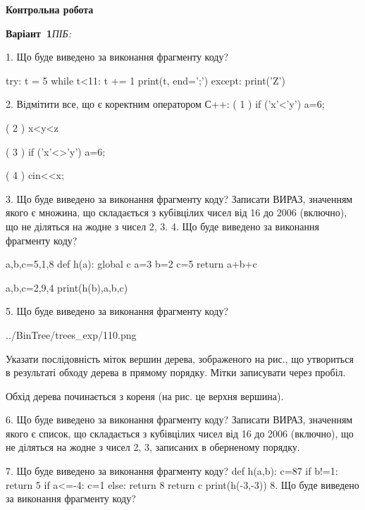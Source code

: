 \documentclass[11pt]{article}
\begin{document}
{\large\textbf{Контрольна робота}}

\textbf{Варіант \No\,1}\hfill \textit{ПІБ:}\,\underline{\hspace{60mm}}
\vspace{4mm}

1. Що буде виведено за виконання фрагменту коду?

try:
    t = 5
    while t<11:
        t += 1
    print(t, end=';')
except:
    print('Z')


2. %
Відмітити все, що є коректним оператором С++:
( 1 ) if ('x'<'y') a=6;

( 2 ) x<y<z

( 3 ) if ('x'<>'y') a=6;

( 4 ) cin<<x;

3. Що буде виведено за виконання фрагменту коду?
Записати ВИРАЗ, значенням якого є множина, що складається з кубівцілих чисел від 16 до 2006 (включно), що не діляться на жодне з чисел 2, 3.
4. Що буде виведено за виконання фрагменту коду?

a,b,c=5,1,8
def h(a):
global c    a=3
    b=2
    c=5
    return a+b+c

a,b,c=2,9,4
print(h(b),a,b,c)

5. Що буде виведено за виконання фрагменту коду?

\begin{center}
	{../BinTree/trees_exp/110.png}
\end{center}
Указати послідовність міток вершин дерева, зображеного на рис., що утвориться в результаті обходу дерева в прямому порядку. Мітки записувати через пробіл.\par Обхід дерева починається з кореня (на рис. це верхня вершина).

6. Що буде виведено за виконання фрагменту коду?
Записати ВИРАЗ, значенням якого є список, що складається з кубівцілих чисел від 16 до 2006 (включно), що не діляться на жодне з чисел 2, 3, записаних в обернено\-му порядку.

7. Що буде виведено за виконання фрагменту коду?
def h(a,b):
      c=87
      if b!=1: return 5
      if a<=-4: c=1
      else: return 8
      return c
   print(h(-3,-3))
8. Що буде виведено за виконання фрагменту коду?
\end{document}
